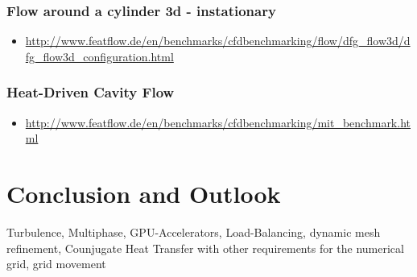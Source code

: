 \documentclass[article,type=msc,colorback,accentcolor=tud2a]{tudthesis}
\begin{document}
      \subsubsection{Flow around a cylinder 3d - instationary}
        \begin{itemize}
          \item\url{http://www.featflow.de/en/benchmarks/cfdbenchmarking/flow/dfg_flow3d/dfg_flow3d_configuration.html}
        \end{itemize}

      \subsubsection{Heat-Driven Cavity Flow}
        \begin{itemize}
          \item \url{http://www.featflow.de/en/benchmarks/cfdbenchmarking/mit_benchmark.html}
        \end{itemize}
      
  \section{Conclusion and Outlook}
    Turbulence, Multiphase, GPU-Accelerators, Load-Balancing, dynamic mesh refinement, Counjugate Heat Transfer with other requirements for the numerical grid, grid movement
\end{document}
